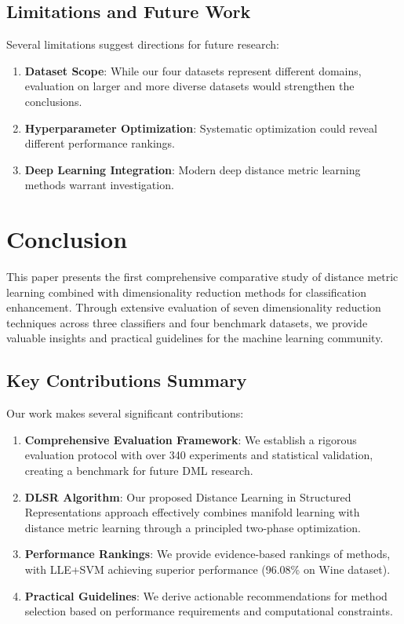 \documentclass[review]{elsarticle}
\begin{document}
\subsection{Limitations and Future Work}

Several limitations suggest directions for future research:

\begin{enumerate}
\item \textbf{Dataset Scope}: While our four datasets represent different domains, evaluation on larger and more diverse datasets would strengthen the conclusions.

\item \textbf{Hyperparameter Optimization}: Systematic optimization could reveal different performance rankings.

\item \textbf{Deep Learning Integration}: Modern deep distance metric learning methods warrant investigation.
\end{enumerate}

\section{Conclusion}
\label{sec:conclusion}

This paper presents the first comprehensive comparative study of distance metric learning combined with dimensionality reduction methods for classification enhancement. Through extensive evaluation of seven dimensionality reduction techniques across three classifiers and four benchmark datasets, we provide valuable insights and practical guidelines for the machine learning community.

\subsection{Key Contributions Summary}

Our work makes several significant contributions:

\begin{enumerate}
\item \textbf{Comprehensive Evaluation Framework}: We establish a rigorous evaluation protocol with over 340 experiments and statistical validation, creating a benchmark for future DML research.

\item \textbf{DLSR Algorithm}: Our proposed Distance Learning in Structured Representations approach effectively combines manifold learning with distance metric learning through a principled two-phase optimization.

\item \textbf{Performance Rankings}: We provide evidence-based rankings of methods, with LLE+SVM achieving superior performance (96.08\% on Wine dataset).

\item \textbf{Practical Guidelines}: We derive actionable recommendations for method selection based on performance requirements and computational constraints.
\end{enumerate}
\end{document}
